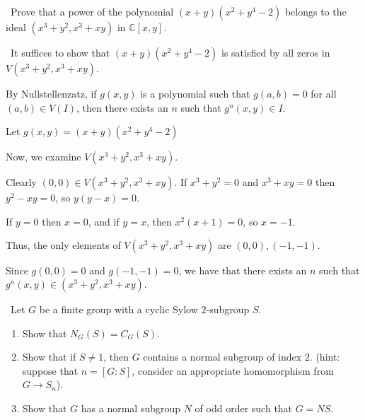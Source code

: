 \documentclass[12pt]{AlgebraQual}
\begin{document}
\newpage


\begin{problem} $\,$
Prove that a power of the polynomial $(x+y)(x^2+y^4-2)$ belongs to the ideal $(x^3+y^2,x^3+xy)$ in $\mathbb{C}[x,y]$.
\end{problem}


\begin{solution}$\,$
It suffices to show that $(x+y)(x^2+y^4-2)$ is satisfied by all zeros in $V(x^3+y^2,x^3+xy)$.

By Nullstellenzatz, if $g(x,y)$ is a polynomial such that $g(a,b)=0$ for all $(a,b)\in V(I)$, then there exists an $n$ such that $g^n(x,y)\in I$.

Let $g(x,y)=(x+y)(x^2+y^4-2)$

Now, we examine $V(x^3+y^2,x^3+xy)$.

Clearly $(0,0)\in V(x^3+y^2,x^3+xy)$. If $x^3+y^2=0$ and $x^3+xy=0$ then $y^2-xy=0$, so $y(y-x)=0$.

If $y=0$ then $x=0$, and if $y=x$, then $x^2(x+1)=0$, so $x=-1$.

Thus, the only elements of $V(x^3+y^2,x^3+xy)$ are $(0,0),(-1,-1)$.

Since $g(0,0)=0$ and $g(-1,-1)=0$, we have that there exists an $n$ such that $g^n(x,y)\in(x^3+y^2,x^3+xy).$
\end{solution}
\newpage



\begin{problem} $\,$
Let $G$ be a finite group with a cyclic Sylow $2$-subgroup $S$.
\begin{enumerate}[label=(\alph*)]
    \item Show that $N_G(S)=C_G(S)$.
    \item Show that if $S\not=1$, then $G$ contains a normal subgroup of index $2$. (hint: suppose that $n=[G:S]$, consider an appropriate homomorphism from $G\to S_n$).
    \item Show that $G$ has a normal subgroup $N$ of odd order such that $G=NS$.
\end{enumerate}
\end{problem}
\end{document}
